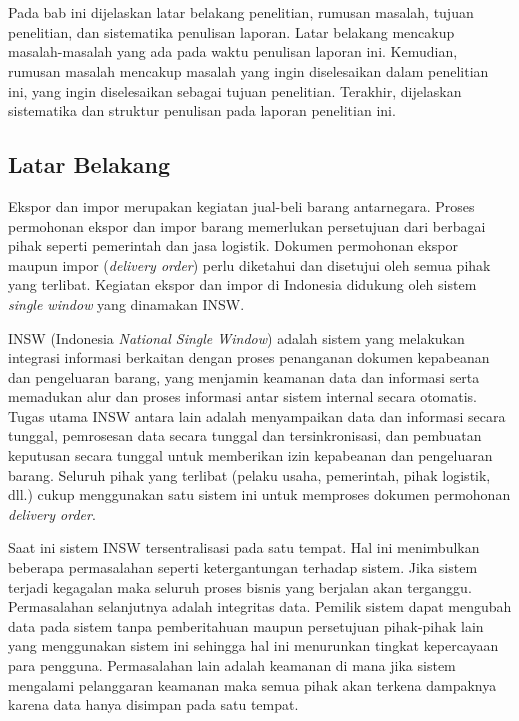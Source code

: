 \chapter{\babSatu}
\label{bab:1}

Pada bab ini dijelaskan latar belakang penelitian, rumusan masalah, tujuan penelitian, dan sistematika penulisan laporan. Latar belakang mencakup masalah-masalah yang ada pada waktu penulisan laporan ini. Kemudian, rumusan masalah mencakup masalah yang ingin diselesaikan dalam penelitian ini, yang ingin diselesaikan sebagai tujuan penelitian. Terakhir, dijelaskan sistematika dan struktur penulisan pada laporan penelitian ini.

\section{Latar Belakang}
\label{sec:latarBelakang}

Ekspor dan impor merupakan kegiatan jual-beli barang antarnegara. Proses permohonan ekspor dan impor barang memerlukan persetujuan dari berbagai pihak seperti pemerintah dan jasa logistik. Dokumen permohonan ekspor maupun impor (\textit{delivery order}) perlu diketahui dan disetujui oleh semua pihak yang terlibat. Kegiatan ekspor dan impor di Indonesia didukung oleh sistem \textit{single window} yang dinamakan INSW.

INSW (Indonesia \textit{National Single Window}) adalah sistem yang melakukan integrasi informasi berkaitan dengan proses penanganan dokumen kepabeanan dan pengeluaran barang, yang menjamin keamanan data dan informasi serta memadukan alur dan proses informasi antar sistem internal secara otomatis. Tugas utama INSW antara lain adalah menyampaikan data dan informasi secara tunggal, pemrosesan data secara tunggal dan tersinkronisasi, dan pembuatan keputusan secara tunggal untuk memberikan izin kepabeanan dan pengeluaran barang. Seluruh pihak yang terlibat (pelaku usaha, pemerintah, pihak logistik, dll.) cukup menggunakan satu sistem ini untuk memproses dokumen permohonan \textit{delivery order}.

Saat ini sistem INSW tersentralisasi pada satu tempat. Hal ini menimbulkan beberapa permasalahan seperti ketergantungan terhadap sistem. Jika sistem terjadi kegagalan maka seluruh proses bisnis yang berjalan akan terganggu. Permasalahan selanjutnya adalah integritas data. Pemilik sistem dapat mengubah data pada sistem tanpa pemberitahuan maupun persetujuan pihak-pihak lain yang menggunakan sistem ini sehingga hal ini menurunkan tingkat kepercayaan para pengguna. Permasalahan lain adalah keamanan di mana jika sistem mengalami pelanggaran keamanan maka semua pihak akan terkena dampaknya karena data hanya disimpan pada satu tempat.

